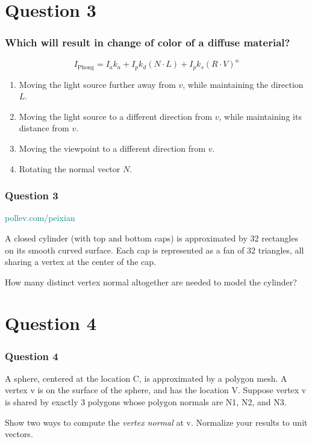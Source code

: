 \documentclass{beamer}
\begin{document}
\section{Question 3}

\begin{frame}
    \frametitle{Which will result in change of color of a diffuse material?}

    \begin{equation*}
        I_\text{Phong} = I_a k_a + I_p k_d  (N \cdot L) + I_p k_s (R \cdot V)^n
    \end{equation*}

    \begin{enumerate}
        \item Moving the light source further away from $v$, while maintaining the direction $L$.
        \item Moving the light source to a different direction from $v$, while maintaining its distance from $v$.
        \item Moving the viewpoint to a different direction from $v$.
        \item Rotating the normal vector $N$.
    \end{enumerate}

\end{frame}

\begin{frame}
    \frametitle{Question 3}

    \begin{tcolorbox}[colback=teal!5!white]
        \textcolor{teal}{pollev.com/peixian}
    \end{tcolorbox}
    \vspace*{1em}

    A closed cylinder (with top and bottom caps) is approximated by 32 rectangles on its 
    smooth curved surface. 
    Each cap is represented as a fan of 32 triangles, 
    all sharing a vertex at the center of the cap. 

    \vspace*{1em}

    How many distinct vertex normal altogether are needed to model the cylinder?

\end{frame}

\section{Question 4}

\begin{frame}
    \frametitle{Question 4}

    A sphere, centered at the location C, is approximated by a polygon mesh.  
    A vertex v is on the surface of the sphere, and has the location V.  
    Suppose vertex v is shared by exactly 3 polygons whose polygon normals are N1, N2, and N3.
    
    \vspace*{1em}

    Show two ways to compute the \textit{vertex normal} at v. Normalize your results to unit vectors.

\end{frame}
\end{document}

